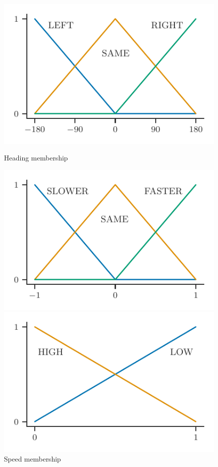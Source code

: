 \documentclass[9pt]{pnas-new}
\begin{document}
\begin{figure}[h]
  \begin{minipage}{0.32\textwidth}
    \centering
    \includegraphics[width=\linewidth]{fig/heading_membership}
    \caption{\label{fig:heading_membership}Heading membership}
    \label{img_1234}
  \end{minipage}%
  \begin{minipage}{0.32\textwidth}
    \centering
    \includegraphics[width=\linewidth]{fig/speed_membership}
    \caption{\label{fig:speed_membership}Speed membership}
    \label{img_2345}
  \end{minipage}%
    \begin{minipage}{0.32\textwidth}
    \centering
    \includegraphics[width=\linewidth]{fig/significance_membership}

\end{minipage}
\end{figure}
\end{document}
